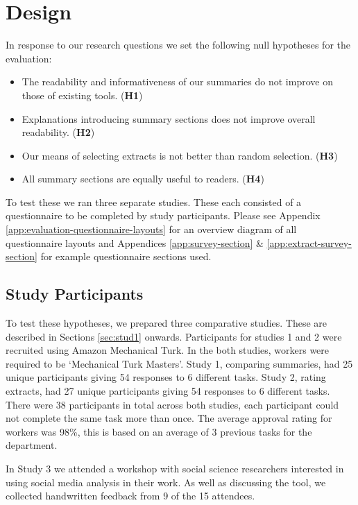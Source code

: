   \section{Design}
    In response to our research questions we set the following null hypotheses for the evaluation:

    \begin{itemize}
      \item{The readability and informativeness of our summaries do not improve on those of existing tools. (\textbf{H1})}
      \item{Explanations introducing summary sections does not improve overall readability. (\textbf{H2})}
      \item{Our means of selecting extracts is not better than random selection. (\textbf{H3})}
      \item{All summary sections are equally useful to readers. (\textbf{H4})}
    \end{itemize}

    To test these we ran three separate studies. These each consisted of a questionnaire to be completed by study participants. Please see Appendix \ref{app:evaluation-questionnaire-layouts} for an overview diagram of all questionnaire layouts and Appendices \ref{app:survey-section} \& \ref{app:extract-survey-section} for example questionnaire sections used.

    \tocless\subsection{Study Participants}
      To test these hypotheses, we prepared three comparative studies. These are described in Sections \ref{sec:stud1} onwards. Participants for studies 1 and 2 were recruited using Amazon Mechanical Turk. In the both studies, workers were required to be `Mechanical Turk Masters'. Study 1, comparing summaries, had 25 unique participants giving 54 responses to 6 different tasks. Study 2, rating extracts, had 27 unique participants giving 54 responses to 6 different tasks. There were 38 participants in total across both studies, each participant could not complete the same task more than once. The average approval rating for workers was 98\%, this is based on an average of 3 previous tasks for the department.

      In Study 3 we attended a workshop with social science researchers interested in using social media analysis in their work. As well as discussing the tool, we collected handwritten feedback from 9 of the 15 attendees.

